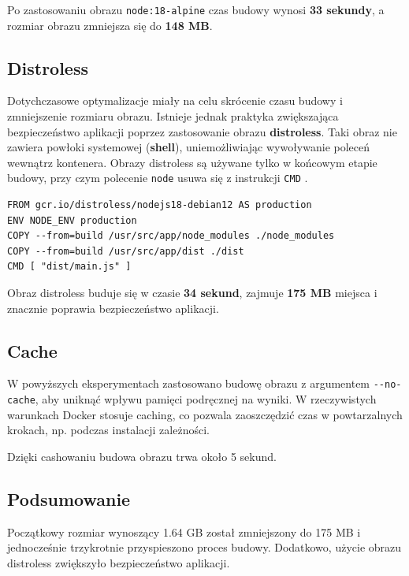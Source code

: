 \documentclass{article}
\begin{document}
Po zastosowaniu obrazu \lstinline|node:18-alpine| czas budowy wynosi \textbf{33 sekundy}, a rozmiar obrazu zmniejsza się do \textbf{148 MB}.

\subsection{Distroless}

Dotychczasowe optymalizacje miały na celu skrócenie czasu budowy i zmniejszenie rozmiaru obrazu. Istnieje jednak praktyka zwiększająca bezpieczeństwo aplikacji poprzez zastosowanie obrazu \textbf{distroless}. Taki obraz nie zawiera powłoki systemowej (\textbf{shell}), uniemożliwiając wywoływanie poleceń wewnątrz kontenera. Obrazy distroless są używane tylko w końcowym etapie budowy, przy czym polecenie \lstinline|node| usuwa się z instrukcji \lstinline|CMD| \cite{MediumDistroless}.

\begin{lstlisting}[caption=Ostatni etap distroless Dockerfile]
FROM gcr.io/distroless/nodejs18-debian12 AS production
ENV NODE_ENV production
COPY --from=build /usr/src/app/node_modules ./node_modules
COPY --from=build /usr/src/app/dist ./dist
CMD [ "dist/main.js" ]
\end{lstlisting}

Obraz distroless buduje się w czasie \textbf{34 sekund}, zajmuje \textbf{175 MB} miejsca i znacznie poprawia bezpieczeństwo aplikacji.

\subsection{Cache}

W powyższych eksperymentach zastosowano budowę obrazu z argumentem \lstinline|--no-cache|, aby uniknąć wpływu pamięci podręcznej na wyniki. W rzeczywistych warunkach Docker stosuje caching, co pozwala zaoszczędzić czas w powtarzalnych krokach, np. podczas instalacji zależności.

Dzięki cashowaniu budowa obrazu trwa około 5 sekund.

\newpage

\subsection{Podsumowanie}

Początkowy rozmiar wynoszący 1.64 GB został zmniejszony do 175 MB i jednocześnie trzykrotnie przyspieszono proces budowy. Dodatkowo, użycie obrazu distroless zwiększyło bezpieczeństwo aplikacji.
\end{document}
